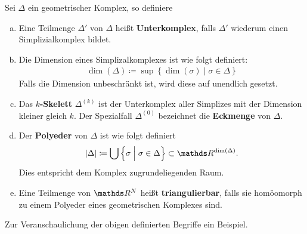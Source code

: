 \begin{Def}
  Sei $\Delta$ ein geometrischer Komplex, so definiere
  \begin{enumerate}[(a)]
  \item Eine Teilmenge $\Delta'$ von $\Delta$ heißt
    \textbf{Unterkomplex}, falls $\Delta'$ wiederum einen
    Simplizialkomplex bildet.
  \item Die Dimension eines Simplizalkomplexes ist wie folgt
    definiert:
    \begin{gather*}
      \dim(\Delta) \coloneqq \sup \left\{ \dim(\sigma) \; \Big| \;
        \sigma \in \Delta \right\}
    \end{gather*}
    Falls die Dimension unbeschränkt ist, wird diese auf unendlich
    gesetzt.
  \item Das \textbf{$k$-Skelett} $\Delta^{(k)}$ ist der Unterkomplex
    aller Simplizes mit der Dimension kleiner gleich $k$. Der
    Spezialfall $\Delta^{(0)}$ bezeichnet die \textbf{Eckmenge} von
    $\Delta$.
  \item Der \textbf{Polyeder} von $\Delta$ ist wie folgt definiert
    \begin{gather*}
      |\Delta| \coloneqq \bigcup \left\{ \sigma \; \Big| \; \sigma \in
        \Delta \right\} \subset \R^{\dim(\Delta)}.
    \end{gather*}
    Dies entspricht dem Komplex zugrundeliegenden Raum.
  \item Eine Teilmenge von $\R^N$ heißt \textbf{triangulierbar}, falls
    sie homöomorph zu einem Polyeder eines geometrischen Komplexes
    sind.
  \end{enumerate}
\end{Def}

Zur Veranschaulichung der obigen definierten Begriffe ein Beispiel.

